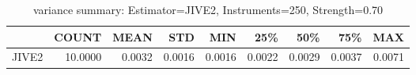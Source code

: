 \begin{table}[ht]
\centering
\caption{variance summary: Estimator=JIVE2, Instruments=250, Strength=0.70}
\begin{tabular}{lrrrrrrrr}
\toprule
 & COUNT & MEAN & STD & MIN & 25\% & 50\% & 75\% & MAX \\
\midrule
JIVE2 & 10.0000 & 0.0032 & 0.0016 & 0.0016 & 0.0022 & 0.0029 & 0.0037 & 0.0071 \\
\bottomrule
\end{tabular}
\end{table}
